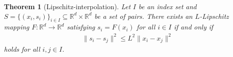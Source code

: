 \documentclass[11pt,a4paper]{article}
\newtheorem{theorem}{Theorem}
\begin{document}
\begin{theorem}[Lipschitz-interpolation]\label{thm:Lipschitz_interpolation} Let $I$ be an index set and $S=\{(x_i,s_i)\}_{i\in I}\subseteq \mathbb{R}^d\times\mathbb{R}^d$ be a set of pairs. There exists an $L$-Lipschitz mapping $F:\mathbb{R}^d\rightarrow\mathbb{R}^d$ satisfying $s_i= F(x_i)$ for all $i\in I$ if and only if
\begin{equation*}
\begin{aligned}
\|s_i-s_j\|^2\leqslant L^2 \|x_i-x_j\|^2
\end{aligned}
\end{equation*}
holds for all $i,j\in I$.
\end{theorem}

%	
	

{}
\end{document}
